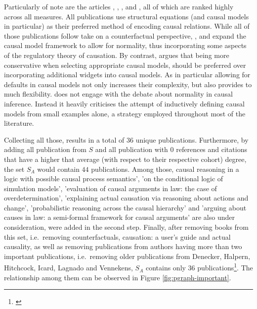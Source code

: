 \documentclass[11pt,a4paper]{book}
\theoremstyle{definition}
\theoremstyle{definition}
\theoremstyle{definition}
\theoremstyle{remark}
\newcommand{\pset}{S}
\newcommand{\prset}{S_{A}}
\begin{document}
Particularly of note are the articles \cite{weslake2015partial}, \cite{blanchard2017cause}, \cite{halpern2011actual}, \cite{glymour2010actual} and \cite{halpern2015graded}, all of which are ranked highly across all measures. 
All publications use structural equations (and causal models in particular) as their preferred method of encoding causal relations.  
While all of those publications follow take on a counterfactual perspective,   \parencite{halpern2011actual}, \parencite{weslake2015partial} and \parencite{halpern2015graded} expand the causal model framework to allow for normality, thus incorporating some aspects of the regulatory theory of causation.
By contrast, \parencite{blanchard2017cause} argues that being more conservative when selecting appropriate causal models, should be preferred over incorporating additional widgets into causal models.
As in particular allowing for defaults in causal models not only increases their complexity, but also provides to much flexibility. 
\parencite{glymour2010actual} does not engage with the debate about normality in causal inference. Instead it heavily criticises the attempt of inductively defining causal models from small examples alone, a strategy employed 
throughout most of the literature.



Collecting all those, results in a total of $36$ unique publications. Furthermore, by adding all publication from $\pset$ and all publication with $0$ references and citations that have a higher that average (with respect to their respective cohort) degree, the set $\prset$ would contain $44$ publications. Among those, causal reasoning in a logic with possible causal process semantics', 'on the conditional logic of simulation models', 'evaluation of causal arguments in law: the case of overdetermination', 'explaining actual causation via reasoning about actions and change', 'probabilistic reasoning across the causal hierarchy' and 'arguing about causes in law: a semi-formal framework for causal arguments' are also under consideration, were added in the second step. 
Finally, after removing books from this set, i.e.\ removing  counterfactuals,  causation: a user's guide and actual causality, as well as removing publications from authors having more than two important publications, i.e.\ removing older publications from Denecker, Halpern, Hitchcock, Icard, Lagnado and Vennekens,  $\prset$ contains only $36$ publications\footnote{\parencite{vennekens2010embracing,
bex2010hybrid,
lee2010representing,
lifschitz2010translating,
glymour2010actual,
claassen2010causal,
gerstenberg2010spreading,
halpern2011actual,
shulz2011if,
briggs2012interventionist,
baumgartner2013regularity,
hyttinen2013discovering,
halpern2015graded,
weslake2015partial,
chockler2015causal,
beckers2016general,
schaffer2016grounding,
halpern2016appropriate,
blanchard2017cause,
wright2017ness,
icard2017normality,
aleksandrowicz2017computational,
fenton2017proposed,
lagnado2017causation,
bochman2018actual,
ibeling2018conditional,
beckers2018principled,
bochman2018laws,
denecker2018causal,
batusov2018situation,
denecker2019explaining,
liepicna2019evaluation,
leblanc2019explaining,
liepicna2020arguing,
khannecessary,
ibeling2020probabilistic}}. The relationship among them can be observed in Figure \ref{fig:pgraph-important}.
\end{document}
